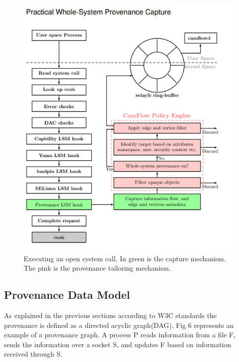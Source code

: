 \begin{figure}
	\centering
	\includegraphics[width=0.7\linewidth]{provenance-capture}
	\caption[open system call]{Executing an open system call. In green is the capture mechanism. The pink is the provenance tailoring mechanism.}
	\label{fig:provenance-capture}
\end{figure}
\subsection{Provenance Data Model}
As explained in the previous sections according to W3C standards the provenance is defined as a directed acyclic graph(DAG). Fig 6 represents an example of a provenance graph. A process P reads information from a file F, sends the information
over a socket S, and updates F based on information received
through S.